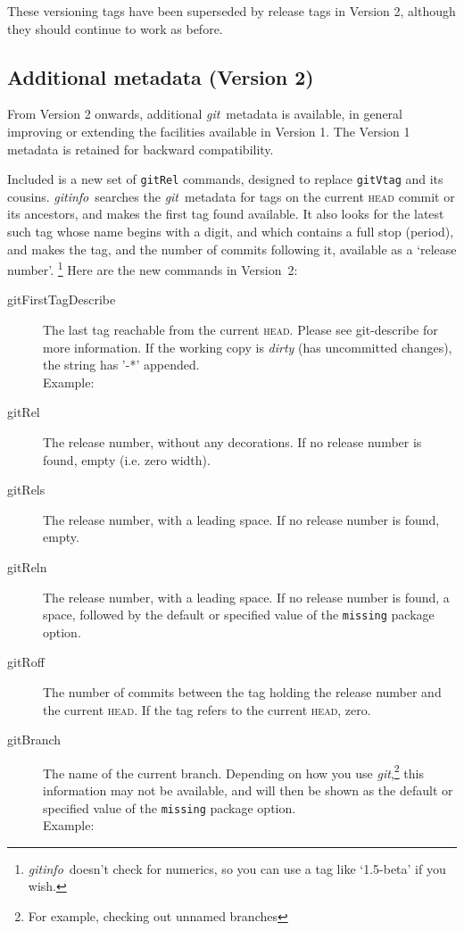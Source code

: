 \documentclass[a4paper,12pt,twoside,openany]{memoir}
\newcommand{\sfit}[1]{\textit{#1}}
\newcommand{\git}{\sfit{git}}
\newcommand{\tpname}{\sfit{gitinfo}}
\begin{document}
These versioning tags have been superseded by release tags in Version 2,
although they should continue to work as before.

\subsection{Additional metadata (Version 2)}

From Version 2 onwards, additional \git\ metadata is available,
in general improving or extending the facilities available in Version 1.
The Version 1 metadata is retained for backward compatibility.

Included is a new set of \texttt{gitRel} commands,
designed to replace \texttt{gitVtag} and its cousins.
\tpname\ searches the \git\ metadata for tags
on the current \textsc{head} commit or its ancestors,
and makes the first tag found available.
It also looks for the latest such tag
whose name begins with a digit, and which contains a full stop (period),
and makes the tag, and the number of commits following it,
available as a `release number'.%
\footnote{\tpname\ doesn't check for numerics, so you can use a tag like `1.5-beta' if you wish.}
Here are the new commands in Version~2:

\begin{description}

\item[gitFirstTagDescribe]
	The last tag reachable from the current \textsc{head}.
    Please see git-describe for more information.
    If the working copy is \textit{dirty} (has uncommitted changes),
    the string has '-*' appended.\\
    Example: \textit{\gitFirstTagDescribe}

\item[gitRel]
    The release number, without any decorations.
    If no release number is found, empty (i.e. zero width).

\item[gitRels]
    The release number, with a leading space.
    If no release number is found, empty.

\item[gitReln]
    The release number, with a leading space.
    If no release number is found, a space,
    followed by the default or specified value of
    the \texttt{missing} package option.

\item[gitRoff]
    The number of commits between the tag holding the release number
    and the current \textsc{head}.
    If the tag refers to the current \textsc{head}, zero.

\item[gitBranch]
    The name of the current branch.
    Depending on how you use \git,\footnote{For example, checking out unnamed branches}
    this information may not be available,
    and will then be shown as the default or specified value of
    the \texttt{missing} package option.\\
    Example: \textit{\gitBranch}

\end{description}
\end{document}
